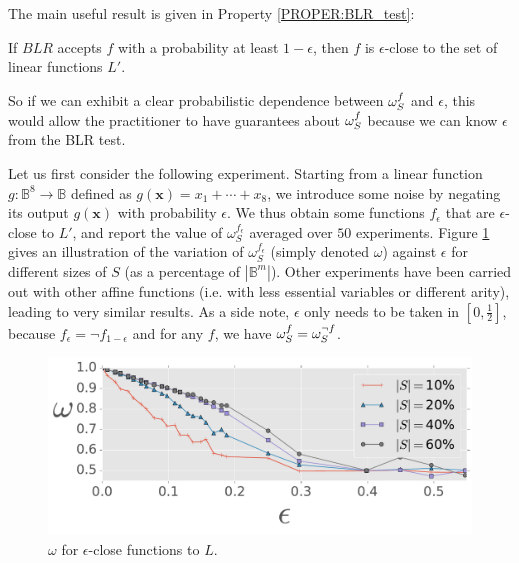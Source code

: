The main useful result is given in Property \ref{PROPER:BLR_test}:
\begin{property}
  \label{PROPER:BLR_test}
  If $BLR$ accepts $f$ with a probability at least $1-\epsilon$, then $f$ is
  $\epsilon$-close to the set of linear functions $L'$.
\end{property}

So if we can exhibit a clear probabilistic dependence between $\omega_{S}^{f}$
and $\epsilon$, this would allow the practitioner to have guarantees about
$\omega_{S}^{f}$ because we can know $\epsilon$ from the BLR test.

Let us first consider the following experiment. Starting from a linear function $g
\colon \mathbb{B}^8 \to \mathbb{B}$ defined as  $g(\mathbf{x}) = x_1 + \cdots +
x_8$, we introduce some noise by negating its output $g(\mathbf{x})$ with
probability $\epsilon$. We thus obtain some functions $f_{\epsilon}$ that are
$\epsilon$-close to $L'$, and report the value of $\omega_S^{f_\epsilon}$ averaged over $50$
experiments.  Figure \ref{omega_vs_eps} gives an
illustration of the variation of $\omega_S^{f_\epsilon}$ (simply denoted
$\omega$) against  $\epsilon$ for different
sizes of $S$ (as a percentage of $|\mathbb{B}^m|$).  Other experiments have
been carried out with other affine functions (i.e.  with less essential
variables or different arity), leading to very similar results. As a side note,
$\epsilon$ only needs to be taken in $[0, \frac{1}{2}]$, because $f_\epsilon =
\neg f_{1 - \epsilon}$ and for any $f$, we have $\omega_{S}^{f} = \omega_S^{\neg
f}$.

\begin{figure}
\begin{center}
\includegraphics[scale=0.6]{figures/omega_vs_eps_dim8_nexp50_std_nEss8.pdf}
  \caption{$\omega$ for $\epsilon$-close functions to $L$.}
\label{omega_vs_eps}
\end{center}
\end{figure}

